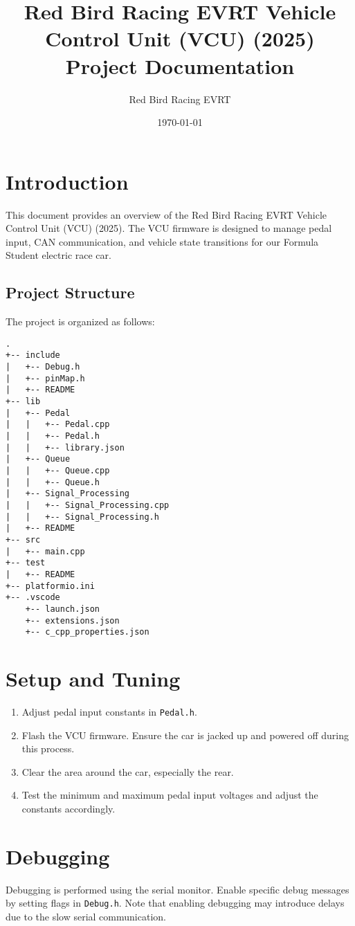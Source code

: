 \documentclass[a4paper,12pt]{article}
\title{Red Bird Racing EVRT Vehicle Control Unit (VCU) (2025) \\ Project Documentation}
\author{Red Bird Racing EVRT}
\date{\today}
\begin{document}
\maketitle

\tableofcontents
\newpage

\section{Introduction}
This document provides an overview of the Red Bird Racing EVRT Vehicle Control Unit (VCU) (2025). The VCU firmware is designed to manage pedal input, CAN communication, and vehicle state transitions for our Formula Student electric race car.

\subsection{Project Structure}
The project is organized as follows:
\begin{lstlisting}[basicstyle=\ttfamily\small]
.
+-- include
|   +-- Debug.h
|   +-- pinMap.h
|   +-- README
+-- lib
|   +-- Pedal
|   |   +-- Pedal.cpp
|   |   +-- Pedal.h
|   |   +-- library.json
|   +-- Queue
|   |   +-- Queue.cpp
|   |   +-- Queue.h
|   +-- Signal_Processing
|   |   +-- Signal_Processing.cpp
|   |   +-- Signal_Processing.h
|   +-- README
+-- src
|   +-- main.cpp
+-- test
|   +-- README
+-- platformio.ini
+-- .vscode
    +-- launch.json
    +-- extensions.json
    +-- c_cpp_properties.json
\end{lstlisting}

\section{Setup and Tuning}
\begin{enumerate}
    \item Adjust pedal input constants in \texttt{Pedal.h}.
    \item Flash the VCU firmware. Ensure the car is jacked up and powered off during this process.
    \item Clear the area around the car, especially the rear.
    \item Test the minimum and maximum pedal input voltages and adjust the constants accordingly.
\end{enumerate}

\section{Debugging}
Debugging is performed using the serial monitor. Enable specific debug messages by setting flags in \texttt{Debug.h}. Note that enabling debugging may introduce delays due to the slow serial communication.
\end{document}

